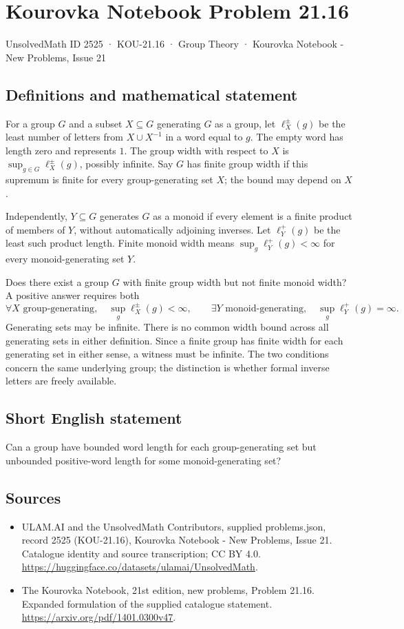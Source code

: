 \documentclass[11pt,a4paper]{article}
\begin{document}
\section*{Kourovka Notebook Problem 21.16}\label{2525}
{\small UnsolvedMath ID 2525 · KOU-21.16 · Group Theory · Kourovka Notebook - New Problems, Issue 21}
\subsection{Definitions and mathematical statement}
For a group $G$ and a subset $X\subseteq G$ generating $G$ as a group,
let $\ell_X^{\pm}(g)$ be the least number of letters from
$X\cup X^{-1}$ in a word equal to $g$. The empty word has length zero
and represents $1$. The group width with respect to $X$ is
$\sup_{g\in G}\ell_X^{\pm}(g)$, possibly infinite.
Say $G$ has finite group width if this supremum is finite for every
group-generating set $X$; the bound may depend on $X$.

Independently, $Y\subseteq G$ generates $G$ as a monoid if every element
is a finite product of members of $Y$, without automatically adjoining
inverses. Let $\ell_Y^+(g)$ be the least such product length. Finite monoid
width means $\sup_g\ell_Y^+(g)<\infty$ for every monoid-generating set $Y$.

Does there exist a group $G$ with finite group width but not finite
monoid width? A positive answer requires both
\[
 \forall X\text{ group-generating},\quad\sup_g\ell_X^{\pm}(g)<\infty,
 \qquad
 \exists Y\text{ monoid-generating},\quad\sup_g\ell_Y^+(g)=\infty.
\]
Generating sets may be infinite. There is no common width bound across
all generating sets in either definition. Since a finite group has
finite width for each generating set in either sense, a witness must
be infinite. The two conditions concern the same underlying group;
the distinction is whether formal inverse letters are freely available.
\subsection{Short English statement}
Can a group have bounded word length for each group-generating set but unbounded positive-word length for some monoid-generating set?
\subsection{Sources}
\begin{itemize}
\item[S1] ULAM.AI and the UnsolvedMath Contributors, supplied problems.json, record 2525 (KOU-21.16), Kourovka Notebook - New Problems, Issue 21. Catalogue identity and source transcription; CC BY 4.0.
\url{https://huggingface.co/datasets/ulamai/UnsolvedMath}.
\item[S2] The Kourovka Notebook, 21st edition, new problems, Problem 21.16. Expanded formulation of the supplied catalogue statement.
\url{https://arxiv.org/pdf/1401.0300v47}.
\end{itemize}
\end{document}
